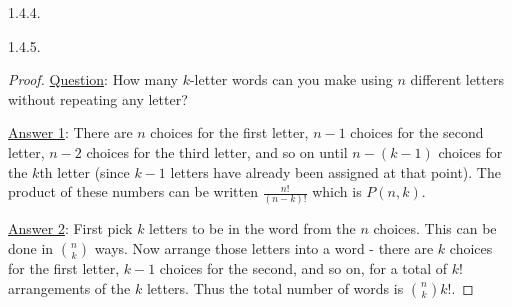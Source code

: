 \begin {itemize}
\begin{ans}{1.4.4.}
	
\end{ans}
\begin{ans}{1.4.5.}
		\begin{proof}
         \underline{Question}: How many $k$-letter words can you make using $n$ different letters without repeating any letter?

         \underline{Answer 1}: There are $n$ choices for the first letter, $n-1$ choices for the second letter, $n-2$ choices for the third letter, and so on until $n - (k-1)$ choices for the $k$th letter (since $k-1$ letters have already been assigned at that point).  The product of these numbers can be written $\frac{n!}{(n-k)!}$ which is $P(n,k)$.

         \underline{Answer 2}: First pick $k$ letters to be in the word from the $n$ choices.  This can be done in ${n \choose k}$ ways.  Now arrange those letters into a word - there are $k$ choices for the first letter, $k-1$ choices for the second, and so on, for a total of $k!$ arrangements of the $k$ letters.  Thus the total number of words is ${n \choose k}k!$.
        \end{proof}
	
\end{ans}
\protect \end {itemize}
